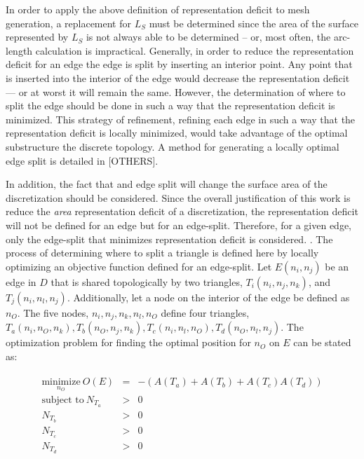 In order to apply the above definition of representation deficit to mesh
generation, a replacement for $L_S$ must be determined since the area of
the surface represented by $L_S$ is not always able to be determined --
or, most often, the arc-length calculation is impractical.
Generally, in order to reduce the representation deficit for an edge 
the edge is split by inserting an interior point. Any point that is
inserted into the interior of the edge would decrease the
representation deficit --- or at worst it will remain the same. However,
the determination of where to split the edge should be done in such
a way that the representation deficit is minimized. This strategy of
refinement, refining each edge in such a way that the representation
deficit is locally minimized,  would take advantage of the optimal
substructure the discrete topology. A method for generating a locally
optimal edge split is detailed in \cite{mclaurin12,mclaurin13}[OTHERS].

In addition, the fact that and edge split will change the surface area
of the discretization should be considered. Since the overall
justification of this work is reduce the {\it area} representation
deficit of a discretization, the representation deficit will not be
defined for an edge but for an edge-split. Therefore, for a given edge,
only the edge-split that minimizes representation deficit is considered.
. The process of determining where to split a triangle is defined here
by locally optimizing an objective function defined for an edge-split.
Let $E\left(n_i,n_j\right)$ be an edge in $D$ that is shared
topologically by two triangles, $T_i\left(n_i,n_j,n_k\right)$, and
$T_j\left(n_i,n_l,n_j\right)$. Additionally, let a node on the interior
of the edge be defined as $n_O$. The five nodes, $n_i,n_j,n_k,n_l,n_O$
define four triangles, $T_a\left(n_i,n_O,n_k\right), T_b\left(n_O,n_j,
n_k\right), T_c\left(n_i,n_l,n_O\right), T_d\left(n_O,n_l,n_j\right)$.
The optimization problem for finding the optimal position for $n_O$ on
$E$ can be stated as:

\begin{eqnarray*}
\begin{array}{rcl}
\underset{n_O}{\text{minimize}} \ O(E) & = & -\left(A\left(T_a\right) + A\left(T_b\right) + A\left(T_c\right) A\left(T_d\right) \right) \\
\text{subject to} \ N_{T_a} & > & 0 \\
N_{T_b} & > & 0 \\ 
N_{T_c} & > & 0 \\
N_{T_d} & > & 0 \\
\end{array}
\end{eqnarray*}

